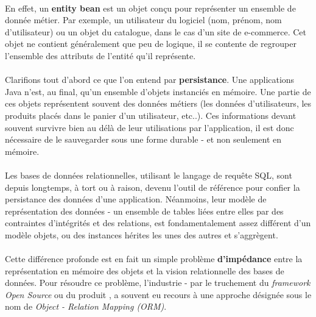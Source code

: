 {  \paragraph{} En effet, un \textbf{entity bean} est un objet conçu pour représenter un ensemble de
  donnée métier. Par exemple, un utilisateur du logiciel (nom, prénom, nom d'utilisateur) ou un
  objet du catalogue, dans le cas d'un site de e-commerce. Cet objet ne contient généralement que
  peu de logique, il se contente de regrouper l'ensemble des attributs de l'entité qu'il représente.

  \paragraph{} Clarifions tout d'abord ce que l'on entend par \textbf{persistance}. Une applications
  Java n'est, au final, qu'un ensemble d'objets instanciés en mémoire. Une partie de ces objets
  représentent souvent des données métiers (les données d'utilisateurs, les produits placés dans le
  panier d'un utilisateur, etc..). Ces informations devant souvent survivre bien au délà de leur
  utilisations par l'application, il est donc nécessaire de le sauvegarder sous une forme durable -
  et non seulement en mémoire.

  \paragraph{} Les bases de données relationnelles, utilisant le langage de requête SQL, sont depuis
  longtemps, à tort ou à raison, devenu l'outil de référence pour confier la persistance des données
  d'une application. Néanmoins, leur modèle de représentation des données - un ensemble de tables
  liées entre elles par des contraintes d'intégrités et des relations, est fondamentalement assez
  différent d'un modèle objets, ou des instances hérites les unes des autres et s'aggrègent.

  \paragraph{} Cette différence profonde est en fait un simple problème \textbf{d'impédance} entre
  la représentation en mémoire des objets et la vision relationnelle des bases de données. Pour
  résoudre ce problème, l'industrie - par le truchement du \textit{framework Open Source}
   ou du produit , a souvent eu recours à une approche
  désignée sous le nom de \textit{Object - Relation Mapping (ORM)}.

}
